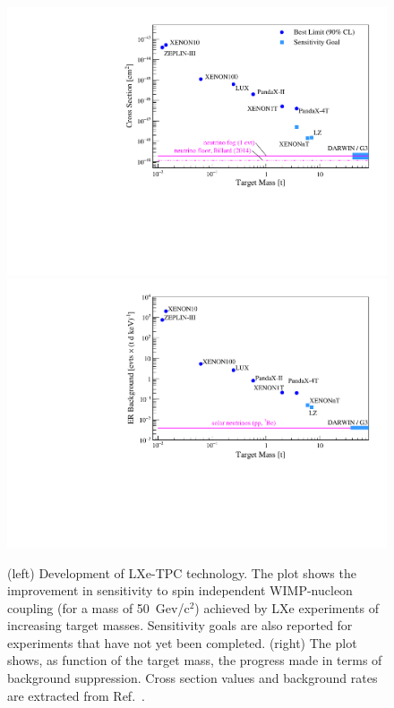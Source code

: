 \begin{figure}[!htbp]
\begin{center}
\includegraphics[width=0.48\columnwidth]{figures/xenon_sens_vs_mass.pdf}
\includegraphics[width=0.48\columnwidth]{figures/xenon_background.pdf}
\caption{(left) Development of LXe-TPC technology. The plot shows the improvement in sensitivity to spin independent WIMP-nucleon coupling (for a mass of 50~Gev/c$^2$) achieved by LXe experiments of increasing target masses. 
Sensitivity goals are also reported for experiments that have not yet been completed. 
(right) The plot shows, as function of the target mass, the progress made in terms of background suppression. 
Cross section values and background rates are extracted from Ref.~\cite{PhysRevLett.100.021303,PhysRevD.94.122001,AKIMOV201214,PhysRevLett.116.161301,Wang_2020,XENON:2018voc,PandaX:2018wtu,PandaX-4T:2021bab,AKERIB201804,XENON:2020kmp}.
}
\label{fig:xenon_evolution}
\end{center}
\end{figure}



